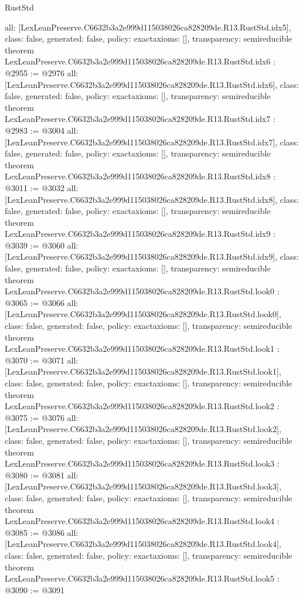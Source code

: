 \begin{lexlean}{RustStd}
\begin{coremodule}
{  all: [LexLeanPreserve.C6632b3a2e999d115038026ca828209de.R13.RustStd.idx5],
  class: false,
  generated: false,
  policy: exact{axioms: []},
  transparency: semireducible
}
theorem LexLeanPreserve.C6632b3a2e999d115038026ca828209de.R13.RustStd.idx6 : @2955 := @2976 {
  all: [LexLeanPreserve.C6632b3a2e999d115038026ca828209de.R13.RustStd.idx6],
  class: false,
  generated: false,
  policy: exact{axioms: []},
  transparency: semireducible
}
theorem LexLeanPreserve.C6632b3a2e999d115038026ca828209de.R13.RustStd.idx7 : @2983 := @3004 {
  all: [LexLeanPreserve.C6632b3a2e999d115038026ca828209de.R13.RustStd.idx7],
  class: false,
  generated: false,
  policy: exact{axioms: []},
  transparency: semireducible
}
theorem LexLeanPreserve.C6632b3a2e999d115038026ca828209de.R13.RustStd.idx8 : @3011 := @3032 {
  all: [LexLeanPreserve.C6632b3a2e999d115038026ca828209de.R13.RustStd.idx8],
  class: false,
  generated: false,
  policy: exact{axioms: []},
  transparency: semireducible
}
theorem LexLeanPreserve.C6632b3a2e999d115038026ca828209de.R13.RustStd.idx9 : @3039 := @3060 {
  all: [LexLeanPreserve.C6632b3a2e999d115038026ca828209de.R13.RustStd.idx9],
  class: false,
  generated: false,
  policy: exact{axioms: []},
  transparency: semireducible
}
theorem LexLeanPreserve.C6632b3a2e999d115038026ca828209de.R13.RustStd.look0 : @3065 := @3066 {
  all: [LexLeanPreserve.C6632b3a2e999d115038026ca828209de.R13.RustStd.look0],
  class: false,
  generated: false,
  policy: exact{axioms: []},
  transparency: semireducible
}
theorem LexLeanPreserve.C6632b3a2e999d115038026ca828209de.R13.RustStd.look1 : @3070 := @3071 {
  all: [LexLeanPreserve.C6632b3a2e999d115038026ca828209de.R13.RustStd.look1],
  class: false,
  generated: false,
  policy: exact{axioms: []},
  transparency: semireducible
}
theorem LexLeanPreserve.C6632b3a2e999d115038026ca828209de.R13.RustStd.look2 : @3075 := @3076 {
  all: [LexLeanPreserve.C6632b3a2e999d115038026ca828209de.R13.RustStd.look2],
  class: false,
  generated: false,
  policy: exact{axioms: []},
  transparency: semireducible
}
theorem LexLeanPreserve.C6632b3a2e999d115038026ca828209de.R13.RustStd.look3 : @3080 := @3081 {
  all: [LexLeanPreserve.C6632b3a2e999d115038026ca828209de.R13.RustStd.look3],
  class: false,
  generated: false,
  policy: exact{axioms: []},
  transparency: semireducible
}
theorem LexLeanPreserve.C6632b3a2e999d115038026ca828209de.R13.RustStd.look4 : @3085 := @3086 {
  all: [LexLeanPreserve.C6632b3a2e999d115038026ca828209de.R13.RustStd.look4],
  class: false,
  generated: false,
  policy: exact{axioms: []},
  transparency: semireducible
}
theorem LexLeanPreserve.C6632b3a2e999d115038026ca828209de.R13.RustStd.look5 : @3090 := @3091 {
}
\end{coremodule}
\end{lexlean}
